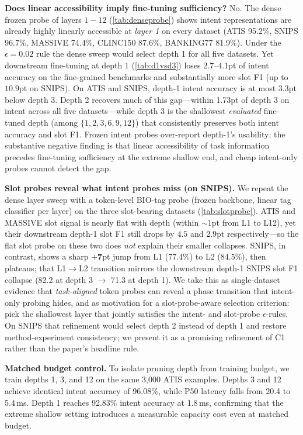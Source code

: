 \documentclass{article}
\begin{document}
\textbf{Does linear accessibility imply fine-tuning sufficiency?} No. The
dense frozen probe of layers $1{-}12$ (\cref{tab:denseprobe}) shows
intent representations are already highly linearly accessible at
\emph{layer 1} on every dataset (ATIS 95.2\%, SNIPS 96.7\%, MASSIVE 74.4\%,
CLINC150 87.6\%, BANKING77 81.9\%). Under the $\epsilon{=}0.02$ rule the
dense sweep would select depth 1 for all five datasets. Yet downstream
fine-tuning at depth 1 (\cref{tab:d1vsd3}) loses $2.7$--$4.1$pt of
intent accuracy on the fine-grained benchmarks and substantially more slot F1
(up to $10.9$pt on SNIPS). On ATIS and SNIPS, depth-1 intent accuracy is at
most $3.3$pt below depth 3. Depth 2 recovers much of this gap---within
1.73pt of depth 3 on intent across all five datasets---while depth 3 is the
shallowest \emph{evaluated} fine-tuned depth (among $\{1,2,3,6,9,12\}$) that
consistently preserves both intent accuracy and slot F1. Frozen intent
probes over-report depth-1's usability; the substantive negative finding is
that linear accessibility of task information precedes fine-tuning
sufficiency at the extreme shallow end, and cheap intent-only probes cannot
detect the gap.

\textbf{Slot probes reveal what intent probes miss (on SNIPS).} We repeat the
dense layer sweep with a token-level BIO-tag probe (frozen backbone, linear
tag classifier per layer) on the three slot-bearing datasets
(\cref{tab:slotprobe}). ATIS and MASSIVE slot signal is nearly flat with
depth (within $\sim$1pt from L1 to L12), yet their downstream depth-1 slot F1
still drops by $4.5$ and $2.9$pt respectively---so the flat slot probe on
these two does \emph{not} explain their smaller collapses. SNIPS, in contrast,
shows a sharp $\mathbf{+7}$pt jump from L1 (77.4\%) to L2 (84.5\%), then
plateaus; that L1$\to$L2 transition mirrors the downstream depth-1 SNIPS slot
F1 collapse (82.2 at depth 3 $\to$ 71.3 at depth 1). We take this as
single-dataset evidence that \emph{task-aligned} token probes can reveal a
phase transition that intent-only probing hides, and as motivation for a
slot-probe-aware selection criterion: pick the shallowest layer that jointly
satisfies the intent- and slot-probe $\epsilon$-rules. On SNIPS that
refinement would select depth 2 instead of depth 1 and restore
method-experiment consistency; we present it as a promising refinement of C1
rather than the paper's headline rule.

\textbf{Matched budget control.} To isolate pruning depth from training
budget, we train depths 1, 3, and 12 on the same 3{,}000 ATIS examples.
Depths 3 and 12 achieve identical intent accuracy of 96.08\%, while P50
latency falls from 20.4 to 5.4\,ms. Depth 1 reaches 92.83\% intent accuracy
at 1.8\,ms, confirming that the extreme shallow setting introduces a
measurable capacity cost even at matched budget.
\end{document}
